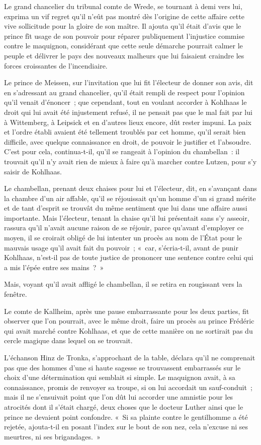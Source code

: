 \documentclass[french,twoside]{book} %
\begin{document}
Le grand chancelier du tribunal comte de Wrede, se tournant à demi vers lui, exprima un vif regret qu’il n’eût pas montré dès l’origine de cette affaire cette vive sollicitude pour la gloire de son maître. Il ajouta qu’il était d’avis que le prince fît usage de son pouvoir pour réparer publiquement l’injustice commise contre le maquignon, considérant que cette seule démarche pourrait calmer le peuple et délivrer le pays des nouveaux malheurs que lui faisaient craindre les forces croissantes de l’incendiaire.\par
Le prince de Meissen, sur l’invitation que lui fit l’électeur de donner son avis, dit en s’adressant au grand chancelier, qu’il était rempli de respect pour l’opinion qu’il venait d’énoncer ; que cependant, tout en voulant accorder à Kohlhaas le droit qui lui avait été injustement refusé, il ne pensait pas que le mal fait par lui à Wittemberg, à Leipsick et en d’autres lieux encore, dût rester impuni. La paix et l’ordre établi avaient été tellement troublés par cet homme, qu’il serait bien difficile, avec quelque connaissance en droit, de pouvoir le justifier et l’absoudre. C’est pour cela, continua-t-il, qu’il se rangeait à l’opinion du chambellan : il trouvait qu’il n’y avait rien de mieux à faire qu’à marcher contre Lutzen, pour s’y saisir de Kohlhaas.\par
Le chambellan, prenant deux chaises pour lui et l’électeur, dit, en s’avançant dans la chambre d’un air affable, qu’il se réjouissait qu’un homme d’un si grand mérite et de tant d’esprit se trouvât du même sentiment que lui dans une affaire aussi importante. Mais l’électeur, tenant la chaise qu’il lui présentait sans s’y asseoir, rassura qu’il n’avait aucune raison de se réjouir, parce qu’avant d’employer ce moyen, il se croirait obligé de lui intenter un procès au nom de l’État pour le mauvais usage qu’il avait fait du pouvoir ; « car, s’écria-t-il, avant de punir Kohlhaas, n’est-il pas de toute justice de prononcer une sentence contre celui qui a mis l’épée entre ses mains ? »\par
Mais, voyant qu’il avait affligé le chambellan, il se retira en rougissant vers la fenêtre.\par
Le comte de Kallheim, après une pause embarrassante pour les deux parties, fit observer que l’on pourrait, avec le même droit, faire un procès au prince Frédéric qui avait marché contre Kohlhaas, et que de cette manière on ne sortirait pas du cercle magique dans lequel on se trouvait.\par
L’échanson Hinz de Tronka, s’approchant de la table, déclara qu’il ne comprenait pas que des hommes d’une si haute sagesse se trouvassent embarrassés sur le choix d’une détermination qui semblait si simple. Le maquignon avait, à sa connaissance, promis de renvoyer sa troupe, si on lui accordait un sauf-conduit ; mais il ne s’ensuivait point que l’on dût lui accorder une amnistie pour les atrocités dont il s’était chargé, deux choses que le docteur Luther ainsi que le prince ne devaient point confondre. « Si sa plainte contre le gentilhomme a été rejetée, ajouta-t-il en posant l’index sur le bout de son nez, cela n’excuse ni ses meurtres, ni ses brigandages. »\par
\end{document}
